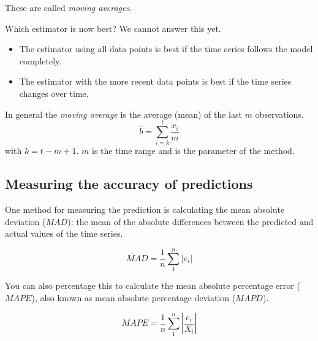 These are called \textit{moving averages}.

Which estimator is now best? We cannot answer this yet.

\begin{itemize}
  \item The estimator using all data points is best if the time series follows the model completely.
  \item The estimator with the more recent data points is best if the time series changes over time.
\end{itemize}

\begin{definition}
  In general the \emph{moving average} is the average (mean) of the last $m$ observations.
  \begin{equation}
    \widehat{b} = \sum_{i=k}^{t} \frac{x_{i}}{m}
  \label{eq:movingAverage}
  \end{equation}
  with $k = t-m+1$. $m$ is the time range and is the parameter of the method.
\end{definition}

\subsection{Measuring the accuracy of predictions}

%

One method for measuring the prediction is calculating the mean absolute deviation ($MAD$): the mean of the absolute differences between the predicted and actual values of the time series.

\begin{definition}[$MAD$]
  \begin{equation}
    MAD = \frac{1}{n} \sum_{1}^{n} \left| e_{i} \right|  
  \label{eq:MAD}
  \end{equation}
\end{definition}

You can also percentage this to calculate the mean absolute percentage error ($MAPE$), also known as mean absolute percentage deviation ($MAPD$).

\begin{definition}[$MAPE$]
  \begin{equation}
    MAPE = \frac{1}{n} \sum_{1}^{n} \left| \frac{e_{i}}{X_i} \right|  
  \label{eq:MAD2}
  \end{equation}
\end{definition}


